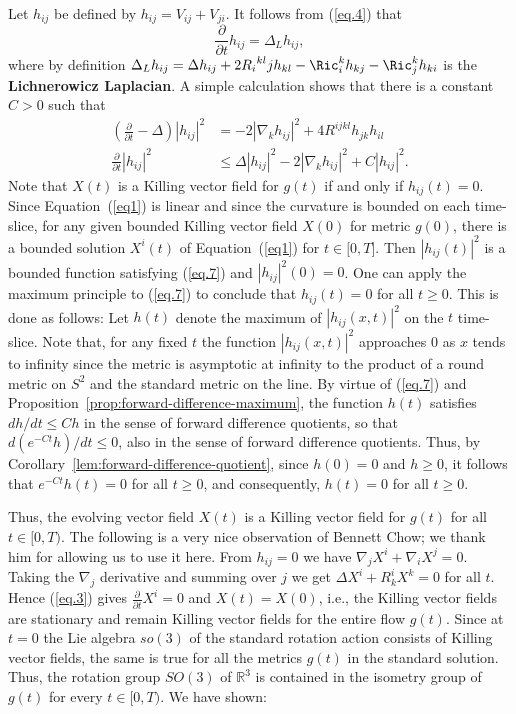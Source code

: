 Let $h_{ij}$ be defined by $h_{ij}= V_{ij}+V_{ji}$. It follows from
(\ref{eq.4}) that
\begin{equation}
\frac{\partial}{\partial t}h_{ij}=\Delta_{L}h_{ij}, \label{eq.5}
\end{equation}
where by definition $\Delta_{L}h_{ij}=\Delta
h_{ij}+2{{R_i}^{kl}j}h_{kl}-\Ric_i^k h_{kj}-\Ric_j^kh_{ki}$ is the \textbf{Lichnerowicz
Laplacian}. A simple calculation shows
that there is a constant $C>0$ such that
\begin{align}
\left(  \frac{\partial}{\partial t}-\Delta\right)  \left\vert h_{ij}
\right\vert ^{2}  &  =-2\left\vert \nabla_{k}h_{ij}\right\vert ^{2}
+4R^{ijkl}h_{jk}h_{il} \label{eq.6}\\
\frac{\partial}{\partial t}\left\vert h_{ij}\right\vert ^{2}  & \leq
\Delta\left\vert h_{ij}\right\vert ^{2}-2\left\vert \nabla_{k}h_{ij}
\right\vert ^{2}+C\left\vert h_{ij}\right\vert ^{2}. \label{eq.7}
\end{align}
Note that $X(t)$ is a Killing vector field for $g(t)$ if and only if
$h_{ij}(t)=0$. Since Equation~(\ref{eq1}) is linear and since the
curvature is bounded on each time-slice, for any given bounded
Killing vector field $X(0)$ for metric $g(0)$, there is a bounded
solution $X^{i}\left( t\right) $ of Equation~(\ref{eq1}) for
$t\in\lbrack0,T]$. Then $\left \vert h_{ij}\left( t\right) \right
\vert^2 $ is a bounded function satisfying (\ref{eq.7}) and $\left
\vert h_{ij} \right \vert^2 (0)=0$. One can apply the maximum
principle to (\ref{eq.7}) to conclude that $h_{ij}(t)=0$ for all
$t\geq 0$. This is done as follows: Let $h(t)$ denote the maximum of
$|h_{ij}(x,t)|^2$ on the $t$ time-slice. Note that, for any fixed
$t$ the function $|h_{ij}(x,t)|^2$ approaches $0$ as $x$ tends to
infinity  since the metric is asymptotic at infinity to the product
of a round metric on $S^2$ and the standard metric on the line. By
virtue of (\ref{eq.7}) and Proposition~\ref{prop:forward-difference-maximum}, the
function $h(t)$ satisfies $dh/dt\le Ch$ in the sense of forward
difference quotients, so that $d(e^{-Ct}h)/dt\le 0$, also in the
sense of forward difference quotients. Thus, by
Corollary~\ref{lem:forward-difference-quotient}, since $h(0)=0$ and $h\ge 0$, it follows
that $e^{-Ct}h(t)=0$ for all $t\ge 0$, and consequently, $h(t)=0$
for all $t\ge 0$.

Thus, the evolving vector field $X( t) $ is a Killing vector field
for $g(t)$ for all $t\in [0,T)$. The following is a very nice
observation of Bennett Chow; we thank him for allowing us to use it
here. From $h_{ij}=0$ we have $\nabla_{j} X^i +\nabla_{i} X^{j}=0$.
Taking the $\nabla_{j}$ derivative and summing over $j$ we get
$\Delta X^i +R^i_kX^k =0$ for all $t$. Hence (\ref{eq.3}) gives
$\frac{\partial}{\partial t}X^{i}=0$ and $X(t)=X(0)$, i.e., the
Killing vector fields are stationary and remain Killing vector
fields for the entire flow $g(t)$.
 Since at $t=0$ the Lie algebra $so(3)$ of the standard rotation action
 consists of Killing vector fields, the same is true for all the metrics $g(t)$
 in the standard solution.
 Thus, the
rotation group $SO(3)$ of $\mathbb{R}^3$ is  contained in the
isometry group of $g(t)$ for every $t\in [0,T)$. We have shown:

